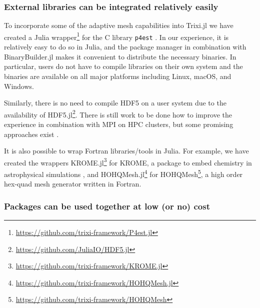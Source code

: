 \documentclass[hidelinks]{juliacon} %
\newcommand{\trixi}{Trixi.jl\xspace}
\begin{document}
\subsubsection{External libraries can be integrated relatively easily}
\label{sec:external-libraries}

To incorporate some of the adaptive mesh capabilities into \trixi
we have created a Julia wrapper\footnote{\url{https://github.com/trixi-framework/P4est.jl}}
for the C library \texttt{p4est} \cite{burstedde2011p4est}. In our experience,
it is relatively easy to do so in Julia, and the package manager in combination
with BinaryBuilder.jl makes it convenient to distribute the necessary binaries.
In particular, users do not have to compile libraries on their own system
and the binaries are available on all major platforms including Linux, macOS,
and Windows.

Similarly, there is no need to compile HDF5 on a user system due to the
availability of HDF5.jl\footnote{\url{https://github.com/JuliaIO/HDF5.jl}}.
There is still work to be done how to improve the experience in combination
with MPI on HPC clusters, but some promising
approaches exist \cite{byrne2021mpi}.

It is also possible to wrap Fortran libraries/tools in Julia. For example, we
have created the wrappers KROME.jl\footnote{\url{https://github.com/trixi-framework/KROME.jl}}
for KROME, a package to embed chemistry in astrophysical simulations
\cite{grassi2014krome}, and HOHQMesh.jl\footnote{\url{https://github.com/trixi-framework/HOHQMesh.jl}}
for HOHQMesh\footnote{\url{https://github.com/trixi-framework/HOHQMesh}}, a high order
hex-quad mesh generator written in Fortran.

\subsubsection{Packages can be used together at low (or no) cost}
\end{document}
